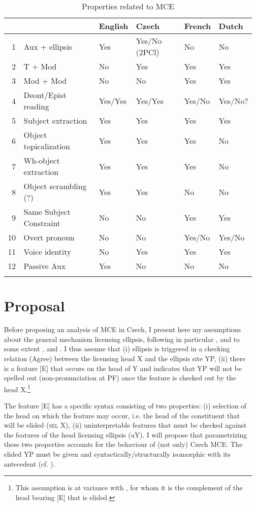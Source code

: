 \documentclass[output=paper,colorlinks,citecolor=brown,
modfonts
]{langscibook}
\begin{document}
\begin{table}
\caption{Properties related to MCE}
\label{tab:1:properties}
 \begin{tabularx}{\textwidth}{rlXXXX}\lsptoprule
    & & English & Czech & French & Dutch\\ \midrule
1 & Aux + ellipsis & Yes & Yes/No (2PCl) & No & No \\
2 & T + Mod & No & Yes & Yes & Yes\\
3 & Mod + Mod & No & No & Yes & Yes\\
4 & Deont/Epist reading & Yes/Yes & Yes/Yes & Yes/No & Yes/No?\\
5 & Subject extraction & Yes & Yes & Yes & Yes\\
6 & Object topicalization & Yes & Yes & Yes & No\\
7 & Wh-object extraction & Yes & Yes & Yes & No\\
8 & Object scrambling (?) & Yes & Yes & No & No\\
9 & Same Subject Constraint & No & No & Yes & Yes\\
10 & Overt pronoun & No & No & Yes/No & Yes/No\\
11 & Voice identity & No & Yes & Yes & Yes\\
12 & Passive Aux & Yes & No & No & No\\ \lspbottomrule
\end{tabularx}
\end{table}

\section{Proposal} \label{sec:5} 

Before proposing an analysis of MCE in Czech, I present here my assumptions about the general mechanism licensing ellipsis, following in particular \cite{Aelbrecht2010}, and to some extent \cite{Lobeck1995}, \cite{Merchant2001} and \cite{Craenenbroeck-Lipták2013}. I thus assume that (i) ellipsis is triggered in a checking relation (Agree) between the licensing head X and the ellipsis site YP, (ii) there is a feature [E] that occurs on the head of Y and indicates that YP will not be spelled out (non-pronunciation at PF) once the feature is checked out by the head X.\footnote{This assumption is at variance with \cite{Merchant2001}, for whom it is the complement of the head bearing [E] that is elided.}

The feature [E] has a specific syntax consisting of two properties: 
(i) selection of the head on which the feature may occur, i.e. the head of the constituent that will be elided (\textsc{sel} X), (ii) uninterpretable features that must be checked against the features of the head licensing ellipsis (uY). I will propose that parametrizing these two properties accounts for the behaviour of (not only) Czech MCE. The elided YP must be given \citep{Barbiers1995,Lobeck1995,Merchant2001} and syntactically/structurally isomorphic with its antecedent (cf. \citealt{fiengo1994indices}).
\end{document}
